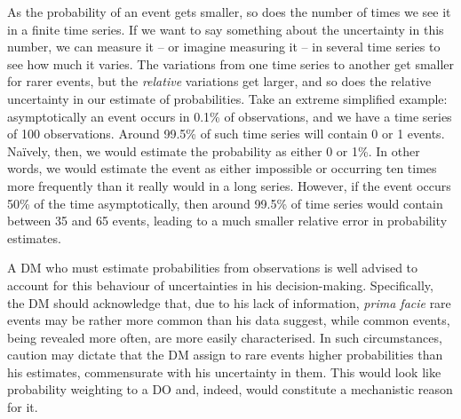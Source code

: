 \documentclass[a4paper, 12pt]{article}
\begin{document}
As the probability of an event gets smaller, so does the number of times we see it in a finite time series. If we want to say something about the uncertainty in this number, we can measure it -- or imagine measuring it -- in several time series to see how much it varies. The variations from one time series to another get smaller for rarer events, but the {\it relative} variations get larger, and so does the relative uncertainty in our estimate of probabilities. Take an extreme simplified example: asymptotically an event occurs in 0.1\% of observations, and we have a time series of 100 observations. 
Around 99.5\% of such time series will contain 0 or 1 events. Na\"{i}vely, then, we would estimate the probability as either 0 or 1\%. In other words, we would estimate the event as either impossible or occurring ten times more frequently than it really would in a long series. However, if the event occurs 50\% of the time asymptotically, then around 99.5\% of time series would contain between 35 and 65 events, leading to a much smaller relative error in probability estimates.

A DM who must estimate probabilities from observations is well advised to account for this behaviour of uncertainties in his decision-making. Specifically, the DM should acknowledge that, due to his lack of information, {\it prima facie} rare events may be rather more common than his data suggest, while common events, being revealed more often, are more easily characterised. In such circumstances, caution may dictate that the DM assign to rare events higher probabilities than his estimates, commensurate with his uncertainty in them. This would look like probability weighting to a DO and, indeed, would constitute a mechanistic reason for it.
\end{document}
